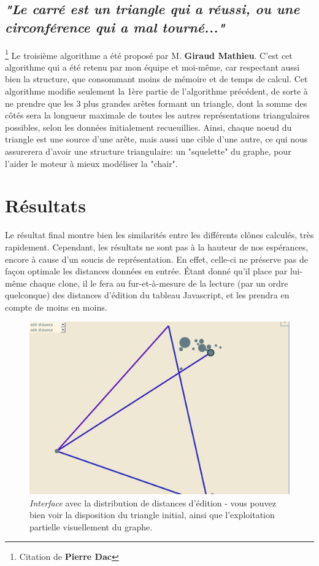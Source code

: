\documentclass[pdftex,12pt,a4paper]{report}
\begin{document}
\begin{spacing}{1.2}
\subsection{\textit{"Le carré est un triangle qui a réussi, ou une circonférence qui a mal tourné..."}}\footnote{Citation de \textbf{Pierre Dac}}
Le troisième algorithme a été proposé par M. \textbf{Giraud Mathieu}. C'est cet algorithme qui a été retenu par mon équipe et moi-même, car respectant aussi bien la structure, que consommant moins de mémoire et de temps de calcul.
\newline
Cet algorithme modifie seulement la 1ère partie de l'algorithme précédent, de sorte à ne prendre que les 3 plus grandes arêtes formant un triangle, dont la somme des côtés sera la longueur maximale de toutes les autres représentations triangulaires possibles, selon les données initialement recueuillies. Ainsi, chaque noeud du triangle est une source d'une arête, mais aussi une cible d'une autre, ce qui nous assurerera d'avoir une structure triangulaire: un "squelette" du graphe, pour l'aider le moteur à mieux modéliser la "chair".

\section{Résultats}

Le résultat final montre bien les similarités entre les différents clônes calculés, très rapidement. Cependant, les résultats ne sont pas à la hauteur de nos espérances, encore à cause d'un soucis de représentation.
En effet, celle-ci ne préserve pas de façon optimale les distances données en entrée. Étant donné qu'il place par lui-même chaque clone, il le fera au fur-et-à-mesure de la lecture (par un ordre quelconque) des distances d'édition du tableau Javascript, et les prendra en compte de moins en moins.

\begin{figure}[H]
\begin{center}
	\includegraphics[scale=0.5]{img/Edit-Distance-Ex.jpg}
\end{center}
\caption{\textit{Interface} avec la distribution de distances d'édition - vous pouvez bien voir la disposition du triangle initial, ainsi que l'exploitation partielle visuellement du graphe.}
\end{figure}


\end{spacing}
\end{document}
